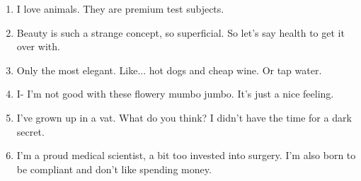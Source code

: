 \begin{enumerate}
	\item I love animals. They are premium test subjects.
	\item Beauty is such a strange concept, so superficial. So let's say health to get it over with.
	\item Only the most elegant. Like... hot dogs and cheap wine. Or tap water.
	\item I- I'm not good with these flowery mumbo jumbo. It's just a nice feeling.
	\item I've grown up in a vat. What do you think? I didn't have the time for a dark secret.
	\item I'm a proud medical scientist, a bit too invested into surgery. I'm also born to be compliant and don't like spending money.
\end{enumerate}


